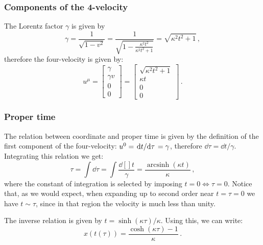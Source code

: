 \documentclass[main.tex]{subfiles}
\begin{document}
\subsubsection{Components of the 4-velocity}

The Lorentz factor \(\gamma \) is given by
%
\begin{equation} \label{eq:constant-acceleration-gamma}
  \gamma = \frac{1}{\sqrt{1-v^2}}
  = \frac{1}{\sqrt{1 - \frac{\kappa^{2} t^{2}}{\kappa^{2} t^{2} + 1} }}
  = \sqrt{\kappa^2 t^2 + 1} \,,
\end{equation}
%
therefore the four-velocity is given by:
%
\begin{equation}
  u^{\mu } =
  \begin{bmatrix}
  \gamma  \\
  \gamma v \\
  0 \\
  0
  \end{bmatrix}
  =
  \begin{bmatrix}
    \sqrt{\kappa^2 t^2 + 1}  \\
    \kappa t \\
    0 \\
    0
  \end{bmatrix}\,.
\end{equation}

\subsubsection{Proper time}

The relation between coordinate and proper time is given by the definition of the first component of the four-velocity: \(u^{0} = \dv*{t}{\tau} = \gamma \), therefore \(\dd{\tau } = \dd{t} / \gamma \).
Integrating this relation we get:
%
\begin{equation}
    \tau = \int \dd{\tau } 
    = \int \frac{\dd[]{t} }{\gamma }
    = \displaystyle \frac{\operatorname{arcsinh}{\left(\kappa t \right)}}{\kappa}\,,
\end{equation}
%
where the constant of integration is selected by imposing \(t = 0 \iff \tau = 0\).
Notice that, as we would expect, when expanding up to second order near \(t = \tau = 0 \) we have \(t \sim \tau \), since in that region the velocity is much less than unity.

The inverse relation is given by \(t = \sinh (\kappa \tau ) / \kappa \). Using this, we can write:
%
\begin{equation}
  x (t(\tau ))  =\frac{\cosh{\left(\kappa \tau \right)} - 1}{\kappa}\,.
\end{equation}
\end{document}

